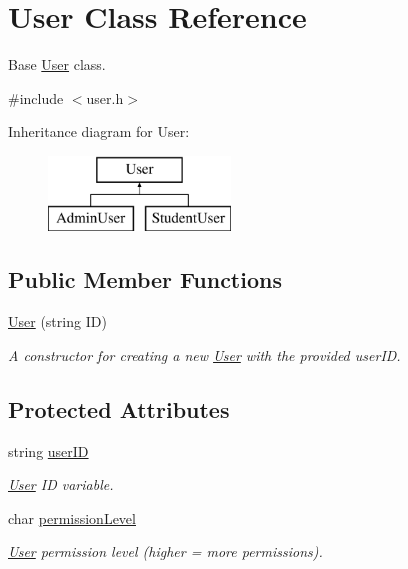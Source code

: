\hypertarget{class_user}{}\section{User Class Reference}
\label{class_user}


Base \hyperlink{class_user}{User} class.  




{\ttfamily \#include $<$user.\+h$>$}

Inheritance diagram for User\+:\begin{figure}[H]
\begin{center}
\leavevmode
\includegraphics[height=2.000000cm]{class_user}
\end{center}
\end{figure}
\subsection*{Public Member Functions}
\begin{DoxyCompactItemize}
\item 
\hyperlink{class_user_a474a84c2e37b139228018a1aa9e814f7}{User} (string I\+D)
\begin{DoxyCompactList}\small\item\em A constructor for creating a new \hyperlink{class_user}{User} with the provided user\+I\+D. \end{DoxyCompactList}\end{DoxyCompactItemize}
\subsection*{Protected Attributes}
\begin{DoxyCompactItemize}
\item 
\hypertarget{class_user_a22f9e8d9729d3595e4ea9af8faea8abc}{}string \hyperlink{class_user_a22f9e8d9729d3595e4ea9af8faea8abc}{user\+I\+D}\label{class_user_a22f9e8d9729d3595e4ea9af8faea8abc}

\begin{DoxyCompactList}\small\item\em \hyperlink{class_user}{User} I\+D variable. \end{DoxyCompactList}\item 
\hypertarget{class_user_a6ae9d72fbd1c50a602b284b5fc659be7}{}char \hyperlink{class_user_a6ae9d72fbd1c50a602b284b5fc659be7}{permission\+Level}\label{class_user_a6ae9d72fbd1c50a602b284b5fc659be7}

\begin{DoxyCompactList}\small\item\em \hyperlink{class_user}{User} permission level (higher = more permissions). \end{DoxyCompactList}\end{DoxyCompactItemize}


